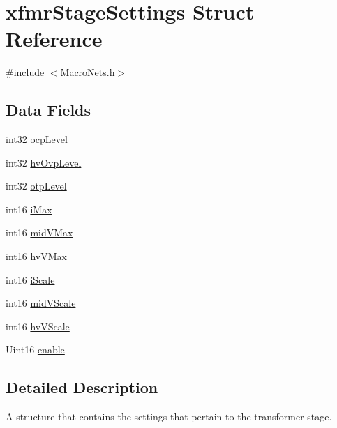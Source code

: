 \hypertarget{a00010}{\section{xfmr\-Stage\-Settings Struct Reference}
\label{a00010}
}


{\ttfamily \#include $<$Macro\-Nets.\-h$>$}

\subsection*{Data Fields}
\begin{DoxyCompactItemize}
\item 
int32 \hyperlink{a00010_a99d85a680a0b0b7f1858d77a3ac216b3}{ocp\-Level}
\item 
int32 \hyperlink{a00010_a311d7915ed53ed668964b7664df881c0}{hv\-Ovp\-Level}
\item 
int32 \hyperlink{a00010_a582f0218997b0b37f365b75ae274e67c}{otp\-Level}
\item 
int16 \hyperlink{a00010_a7f041e2df9592fb461a013cdb67af348}{i\-Max}
\item 
int16 \hyperlink{a00010_a251fa7af71c610bf2b193afde33e1338}{mid\-V\-Max}
\item 
int16 \hyperlink{a00010_a55b65a695862a846307f5131b1220cbe}{hv\-V\-Max}
\item 
int16 \hyperlink{a00010_a3b4f123000ae32ca041c6286e5c92fd4}{i\-Scale}
\item 
int16 \hyperlink{a00010_a44cb584d774e345422c57cc155b65d0c}{mid\-V\-Scale}
\item 
int16 \hyperlink{a00010_a3a22ae7b7c6bf805037d571fce3652b8}{hv\-V\-Scale}
\item 
Uint16 \hyperlink{a00010_aef5e40360d79d34e95c2b412d4e4063b}{enable}
\end{DoxyCompactItemize}


\subsection{Detailed Description}
A structure that contains the settings that pertain to the transformer stage. 

